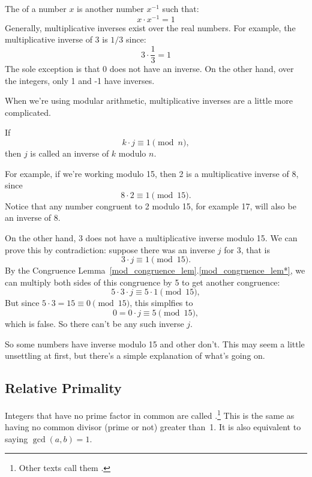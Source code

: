 \section{}\label{sec:prime}


The  of a number $x$ is another number
$x^{-1}$ such that: %
\[
x \cdot x^{-1} = 1
\]
Generally, multiplicative inverses exist over the real numbers.  For
example, the multiplicative inverse of 3 is $1 / 3$ since:
\[
3 \cdot \frac{1}{3} = 1
\]
The sole exception is that 0 does not have an inverse.  On the other
hand, over the integers, only 1 and -1 have inverses.

When we're using modular arithmetic, multiplicative inverses are a
little more complicated.
\begin{definition}\label{mod_inverse_def}
If
\[
k \cdot j \equiv 1 \pmod n,
\]
then $j$ is called an inverse of $k$ modulo $n$.
\end{definition}

For example, if we're working modulo 15, then 2 is a multiplicative
inverse of 8, since
\[
8 \cdot 2 \equiv 1 \pmod{15}.
\]
Notice that any number congruent to 2 modulo 15, for example 17, will
also be an inverse of 8.

On the other hand, 3 does not have a multiplicative inverse modulo 15.
We can prove this by contradiction: suppose there was an inverse $j$
for 3, that is
\[
3 \cdot j \equiv 1 \pmod{15}.
\]
By the Congruence Lemma~\ref{mod_congruence_lem}.\ref{mod_congruence_lem*},
we can multiply both sides of this congruence by 5 to get another
congruence:
\[
5 \cdot 3 \cdot j  \equiv 5 \cdot 1 \pmod{15},
\]
But since $5 \cdot 3 = 15 \equiv 0 \pmod{15}$, this simplfies to
\[
0 = 0 \cdot j \equiv 5 \pmod{15},
\]
which is false.  So there can't be any such inverse $j$.

So some numbers have inverse modulo 15 and other don't.  This may seem
a little unsettling at first, but there's a simple explanation of
what's going on.

\subsection{Relative Primality}

Integers that have no prime factor in common are called
.\footnote{Other texts call them
  .}  This is the same as having no common divisor
(prime or not) greater than~1.  It is also equivalent to saying
$\gcd(a, b) = 1$.

